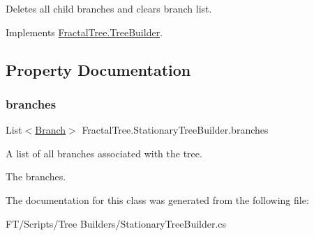 Deletes all child branches and clears branch list. 



Implements \hyperlink{class_fractal_tree_1_1_tree_builder}{Fractal\+Tree.\+Tree\+Builder}.



\subsection{Property Documentation}
\mbox{\label{class_fractal_tree_1_1_stationary_tree_builder_a103e903dbfba82226ab6cbb08fff382a}} 
\subsubsection{\texorpdfstring{branches}{branches}}
{\footnotesize\ttfamily List$<$\hyperlink{interface_fractal_tree_1_1_branch}{Branch}$>$ Fractal\+Tree.\+Stationary\+Tree\+Builder.\+branches\hspace{0.3cm}{\ttfamily [get]}}



A list of all branches associated with the tree. 

The branches.

The documentation for this class was generated from the following file\+:\begin{DoxyCompactItemize}
\item 
F\+T/\+Scripts/\+Tree Builders/Stationary\+Tree\+Builder.\+cs\end{DoxyCompactItemize}
